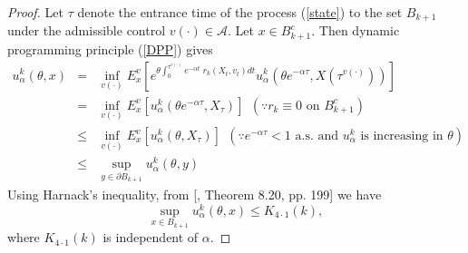 \documentclass[11pt]{amsart}
\numberwithin{equation}{section}
\begin{document}
\begin{proof}
Let $\tau$ denote the entrance time of the process (\ref{state}) to the set $B_{k+1}$ under  
the  admissible control
 $v(\cdot)\in \mathcal A$. Let $x\in B^c_{k+1}$. Then dynamic programming principle (\ref{DPP}) gives 
\begin{eqnarray*}
u^k_{\alpha}(\theta,x) &=&  \inf_{v(\cdot)} E^v_x\left[ e^{\theta\int_{0}^{\tau^{v(\cdot)}} e^{-\alpha t} \; r_k(X_t,v_t) dt}
u^k_{\alpha}\left(\theta e^{-\alpha \tau}, X(\tau^{v(\cdot)})\right) \right] \\
&=&  \inf_{v(\cdot)} E^v_x\left[ u^k_{\alpha}(\theta e^{-\alpha \tau},X_{\tau}) 
\right] \ \ (\because r_k\equiv 0 \mbox{ on } B^c_{k+1}) \\
&\leq& \inf_{v(\cdot)} E^v_x\left[ u^k_{\alpha}(\theta ,X_{\tau}) 
\right] \ \ ( \because e^{-\alpha \tau} < 1  \mbox{ a.s. and } 
u^k_{\alpha} \mbox{ is increasing in } \theta ) \\
&\leq& \sup_{y\in \partial B_{k+1}} u^k_{\alpha}(\theta,y) %
\end{eqnarray*}
Using Harnack's inequality, from [\cite{gilbarg_trudinger}, Theorem 8.20, pp. 199] 
  we have 
\begin{equation}\label{Harnack_extension}
\sup_{x\in B_{k+1}} u^k_{\alpha}(\theta,x) %
 \leq K_{4 \cdot 1}(k),
\end{equation}
where $K_{4 \cdot 1}(k)$ is independent of $\alpha$. %


\end{proof}
\end{document}
